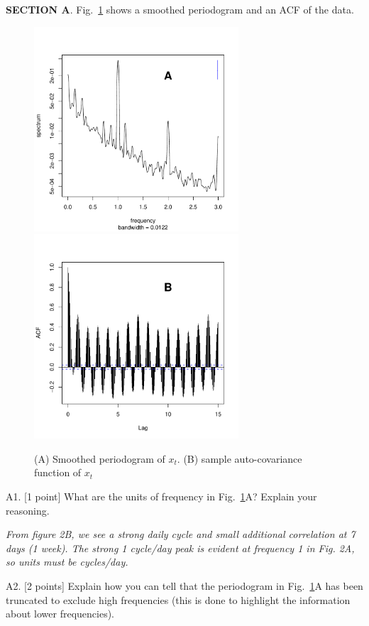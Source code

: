 \documentclass[11pt]{article}
\begin{document}
{\bf SECTION A}. Fig.~\ref{fig:summary} shows a smoothed periodogram and an ACF of the data.
\begin{figure}
\vspace{-1cm}
\includegraphics[width=3in,height=3in]{ER-um-spec-closeup}
\includegraphics[width=3in,height=3in]{ER-um-acf}
\vspace{-0.5cm}
\caption{(A) Smoothed periodogram of $x_t$. (B) sample auto-covariance function of $x_t$}\label{fig:summary}
\end{figure}

A1. [1 point] What are the units of frequency in
Fig.~\ref{fig:summary}A? Explain your reasoning.

{\it From figure 2B, we see a strong daily cycle and small additional
correlation at 7 days (1 week). The strong 1 cycle/day peak is
evident at frequency 1 in Fig. 2A, so units must be
cycles/day.}


A2. [2 points] Explain how you can tell that the periodogram in
Fig.~\ref{fig:summary}A has been truncated to exclude high
frequencies (this is done to highlight the information about lower
frequencies).
\end{document}
